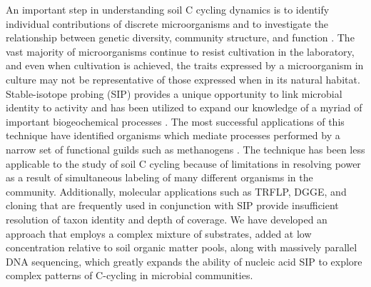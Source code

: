 An important step in understanding soil C cycling dynamics is to identify individual contributions of discrete microorganisms and to investigate the relationship between genetic diversity, community structure, and function \cite{O_Donnell_2002}. The vast majority of microorganisms continue to resist cultivation in the laboratory, and even when cultivation is achieved, the traits expressed by a microorganism in culture may not be representative of those expressed when in its natural habitat. Stable-isotope probing (SIP) provides a unique opportunity to link microbial identity to activity and has been utilized to expand our knowledge of a myriad of important biogeochemical processes \cite{Chen_Murrell_2010}. The most successful applications of this technique have identified organisms which mediate processes performed by a narrow set of functional guilds such as methanogens \cite{Lu_2005}. The technique has been less applicable to the study of soil C cycling because of limitations in resolving power as a result of simultaneous labeling of many different organisms in the community. Additionally, molecular applications such as TRFLP, DGGE, and cloning that are frequently used in conjunction with SIP provide insufficient resolution of taxon identity and depth of coverage. We have developed an approach that employs a complex mixture of substrates, added at low concentration relative to soil organic matter pools, along with massively parallel DNA sequencing, which greatly expands the ability of nucleic acid SIP to explore complex patterns of C-cycling in microbial communities. 

